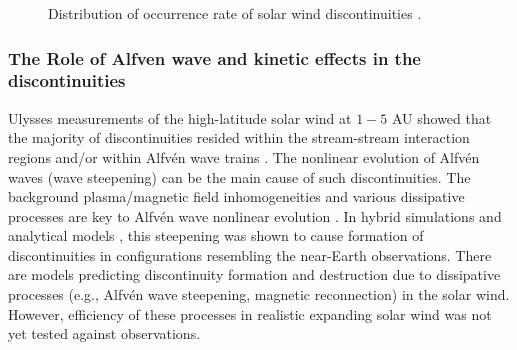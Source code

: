 \documentclass[
  letterpaper,
  DIV=11,
  numbers=noendperiod]{scrartcl}
\begin{document}
\begin{figure}


\caption{\label{fig-1}Distribution of occurrence rate of solar wind discontinuities \citep{sodingRadialLatitudinalDependencies2001}.}

\end{figure}%

\subsubsection{The Role of Alfven wave and kinetic effects in the discontinuities}\label{the-role-of-alfven-wave-and-kinetic-effects-in-the-discontinuities}

Ulysses measurements of the high-latitude solar wind at \(1-5\) AU showed that the majority of discontinuities resided within the stream-stream interaction regions and/or within Alfvén wave trains \citep{tsurutaniInterplanetaryDiscontinuitiesAlfven1995, tsurutaniReviewDiscontinuitiesAlfven1999}. The nonlinear evolution of Alfvén waves (wave steepening) can be the main cause of such discontinuities. The background plasma/magnetic field inhomogeneities and various dissipative processes are key to Alfvén wave nonlinear evolution \citep{Lerche75, Prakash&Diamond99, Medvedev97:prl, Nariyuki14, Yang15}. In hybrid simulations \citep[see][]{Vasquez&Hollweg98, Vasquez&Hollweg01, TenBarge&Howes13} and analytical models \citep[e.g.,][]{Kennel88:jetp, Hada89, Malkov91, Wu&Kennel92, Medvedev97:pop}, this steepening was shown to cause formation of discontinuities in configurations resembling the near-Earth observations. There are models predicting discontinuity formation \citep{Servidio15, Podesta&Roytershteyn17} and destruction \citep{Servidio11,Matthaeus15} due to dissipative processes (e.g., Alfvén wave steepening, magnetic reconnection) in the solar wind. However, efficiency of these processes in realistic expanding solar wind was not yet tested against observations.
\end{document}
